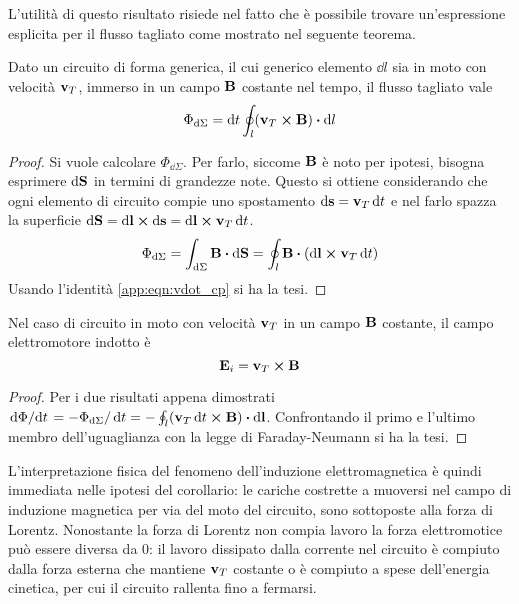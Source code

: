 L'utilità di questo risultato risiede nel fatto che è possibile trovare un'espressione esplicita per il flusso
tagliato come mostrato nel seguente teorema.
\begin{thm}
    Dato un circuito di forma generica, il cui generico elemento $\dd{l}$ sia in moto con velocità $\vb{v}_T$,
    immerso in un campo $\vb{B}$ costante nel tempo, il flusso tagliato vale
    \[
        \Phi_{\dd{\Sigma}}=\dd{t}\oint_l(\vb{v}_T\cp\vb{B})\vdot\dd{l}
    \]
\end{thm}
\begin{proof}
    Si vuole calcolare $\Phi_{\dd{\Sigma}}$. Per farlo, siccome $\vb{B}$ è noto per ipotesi, bisogna esprimere
    $\dd{\vb{S}}$ in termini di grandezze note. Questo si ottiene considerando che
    ogni elemento di circuito compie uno spostamento $\dd{\vb{s}}=\vb{v}_T\dd{t}$ e nel
    farlo spazza la superficie $\dd{\vb{S}}=\dd{\vb{l}}\cp\dd{\vb{s}}=\dd{\vb{l}}\cp\vb{v}_T\dd{t}$.
    \[
        \Phi_{\dd{\Sigma}}=\int_{\dd{\Sigma}}\vb{B}\vdot\dd{\vb{S}}=\oint_l\vb{B}\vdot(\dd{\vb{l}}\cp\vb{v}_T\dd{t})
    \]
    Usando l'identità \eqref{app:eqn:vdot_cp} si ha la tesi.
\end{proof}

\begin{cor}
    Nel caso di circuito in moto con velocità $\vb{v}_T$ in un campo $\vb{B}$ costante, il campo elettromotore indotto è
    \[
        \vb{E}_i=\vb{v}_T\cp\vb{B}
    \]
\end{cor}
\begin{proof}
    Per i due risultati appena dimostrati $\dv*{\Phi}{t}=-\Phi_{\dd{\Sigma}}/\dd{t}=-\oint_l(\vb{v}_T\dd{t}\cp\vb{B})\vdot\dd{\vb{l}}$.
    Confrontando il primo e l'ultimo membro dell'uguaglianza con la legge di Faraday-Neumann si ha la tesi.
\end{proof}
L'interpretazione fisica del fenomeno dell'induzione elettromagnetica è quindi immediata nelle ipotesi del corollario:
le cariche costrette a muoversi nel campo di induzione magnetica per via del moto del circuito, sono sottoposte alla forza di Lorentz.
Nonostante la forza di Lorentz non compia lavoro la forza elettromotice può essere diversa da $0$:
il lavoro dissipato dalla corrente nel circuito è compiuto dalla forza esterna che mantiene $\vb{v}_T$ costante
o è compiuto a spese dell'energia cinetica, per cui il circuito rallenta fino a fermarsi.



